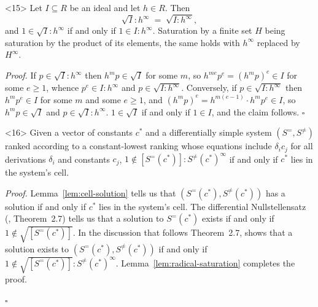 \documentclass{article}
\theoremstyle{definition}
\theoremstyle{plain}
\newcommand{\qedbox}{\hspace*{\fill}\ensuremath{\square}}
\begin{document}
  \smallskip
  \begin{lemma}<15>
  \label{lem:radical-saturation}
  Let $I \subseteq R$ be an ideal and let $h \in R$.  Then
  \[
  \sqrt{I} : h^\infty \;=\; \sqrt{I : h^\infty} ,
  \]
  and $1 \in \sqrt{I} : h^\infty$ if and only if $1 \in I : h^\infty$.
  Saturation by a finite set $H$ being saturation by the product of its elements,
  the same holds with $h^\infty$ replaced by $H^\infty$.
  \end{lemma}

  {\it Proof.}
  If $p \in \sqrt{I} : h^\infty$ then $h^m p \in \sqrt{I}$ for some $m$, so
  $h^{me} p^e = (h^m p)^e \in I$ for some $e \ge 1$, whence $p^e \in I : h^\infty$
  and $p \in \sqrt{I : h^\infty}$.  Conversely, if $p \in \sqrt{I : h^\infty}$
  then $h^m p^e \in I$ for some $m$ and some $e \ge 1$, and
  $(h^m p)^e = h^{m(e-1)} \cdot h^m p^e \in I$, so $h^m p \in \sqrt{I}$ and
  $p \in \sqrt{I} : h^\infty$.  $1 \in \sqrt{I}$ if and only if $1 \in I$, and the
  claim follows.
  \qedbox

\medskip
\begin{lemma}<16>
\label{lem:cell-consistency}
Given a vector of constants $c^*$ and a differentially simple system
$(S^=, S^{\ne})$ ranked according to a constant-lowest ranking whose equations
include $\delta_i c_j$ for all derivations $\delta_i$ and constants $c_j$,
$1 \notin [S^=(c^*)] : S^{\ne}(c^*)^\infty$ if and only if $c^*$ lies in the
system's cell.
\end{lemma}

{\it Proof.}
Lemma~\ref{lem:cell-solution} tells us that $(S^=(c^*), S^{\ne}(c^*))$
has a solution if and only if $c^*$ lies in the system's cell.
The differential Nullstellensatz
(\cite{hubert2}, Theorem~2.7) tells us that a solution to $S^=(c^*)$ exists
if and only if $1 \notin \sqrt{[S^=(c^*)]}$.  In the discussion
that follows Theorem~2.7, \cite{hubert2} shows that a solution exists to $(S^=(c^*), S^{\ne}(c^*))$
if and only if $1 \notin \sqrt{[S^=(c^*)]} : S^{\ne}(c^*)^\infty$.
Lemma~\ref{lem:radical-saturation} completes the proof.


\qedbox
\end{document}
